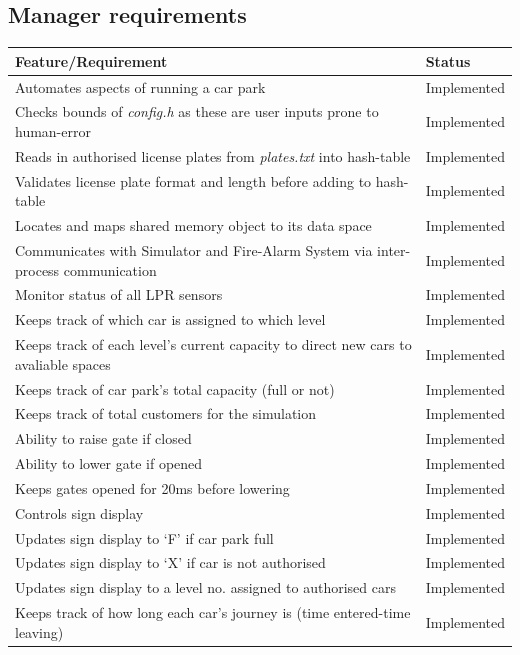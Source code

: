 \documentclass[a4paper]{article}
\begin{document}
\subsection{Manager requirements}
\begin{tabular}{|m{24.7em}|l|}
  \hline
  \cellcolor{gray!10} \textbf{Feature\slash Requirement} & \cellcolor{gray!10} \textbf{Status}\\
  \hline
  Automates aspects of running a car park & \cellcolor{green!40}Implemented\\
  \hline
  Checks bounds of \emph{config.h} as these are user inputs prone to human-error & \cellcolor{green!40}Implemented\\
  \hline
  Reads in authorised license plates from \emph{plates.txt} into hash-table & \cellcolor{green!40}Implemented\\
  \hline
  Validates license plate format and length before adding to hash-table & \cellcolor{green!40}Implemented\\
  \hline
  Locates and maps shared memory object to its data space & \cellcolor{green!40}Implemented\\
  \hline
  Communicates with Simulator and Fire-Alarm System via inter-process communication & \cellcolor{green!40}Implemented\\
  \hline
  Monitor status of all LPR sensors & \cellcolor{green!40}Implemented\\
  \hline
  Keeps track of which car is assigned to which level & \cellcolor{green!40}Implemented\\
  \hline
  Keeps track of each level’s current capacity to direct new cars to avaliable spaces & \cellcolor{green!40}Implemented\\
  \hline
  Keeps track of car park’s total capacity (full or not) & \cellcolor{green!40}Implemented\\
  \hline
  Keeps track of total customers for the simulation & \cellcolor{green!40}Implemented\\
  \hline
  Ability to raise gate if closed & \cellcolor{green!40}Implemented\\
  \hline
  Ability to lower gate if opened & \cellcolor{green!40}Implemented\\
  \hline
  Keeps gates opened for 20ms before lowering & \cellcolor{green!40}Implemented\\
  \hline
  Controls sign display & \cellcolor{green!40}Implemented\\
  \hline
  Updates sign display to ‘F’ if car park full & \cellcolor{green!40}Implemented\\
  \hline
  Updates sign display to ‘X’ if car is not authorised & \cellcolor{green!40}Implemented\\
  \hline
  Updates sign display to a level no. assigned to authorised cars & \cellcolor{green!40}Implemented\\
  \hline
  Keeps track of how long each car's journey is (time entered-time leaving) & \cellcolor{green!40}Implemented\\
  \hline
\end{tabular}
\end{document}

